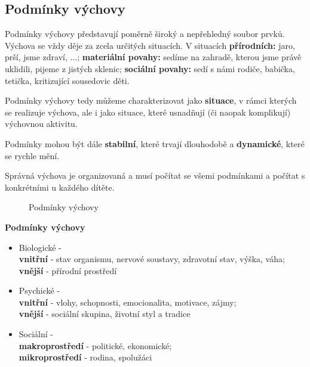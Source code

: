 \documentclass[a4paper,12pt]{report}
\begin{document}
\subsection*{Podmínky výchovy}
Podmínky výchovy představují poměrně široký a nepřehledný soubor prvků. Výchova se vždy děje za zcela určitých situacích. V situacích \textbf{přírodních:} jaro, prší, jsme zdraví, ...; \textbf{materiální povahy:} sedíme na zahradě, kterou jsme právě uklidili, pijeme z jistých sklenic; \textbf{sociální povahy:} sedí s námi rodiče, babička, tetička, kritizující sousedovic děti.

Podmínky výchovy tedy můžeme charakterizovat jako \textbf{situace}, v rámci kterých se realizuje výchova, ale i jako situace, které usnadňují (či naopak komplikují) výchovnou aktivitu.

Podmínky mohou být dále \textbf{stabilní}, které trvají dlouhodobě a \textbf{dynamické}, které se rychle mění.

Správná výchova je organizovaná a musí počítat se všemi podmínkami a počítat s konkrétními u každého dítěte.

\begin{figure}[ht!]
\centering
{}  
\caption{Podmínky výchovy}
\end{figure}

\pagelogos

\begin{samepage}
\textbf{Podmínky výchovy}
\pagelogos
\begin{itemize}
 \item Biologické - \\
    \textbf{vnitřní} - stav organismu, nervové soustavy, zdravotní stav, výška, váha; \\
    \textbf{vnější} - přírodní prostředí
    
 \item Psychické - \\
    \textbf{vnitřní} - vlohy, schopnosti, emocionalita, motivace, zájmy; \\
    \textbf{vnější} - sociální skupina, životní styl a tradice
    
 \item Sociální - \\
    \textbf{makroprostředí} - politické, ekonomické;\\
    \textbf{mikroprostředí} - rodina, spolužáci
\end{itemize}
\end{samepage}
\end{document}
